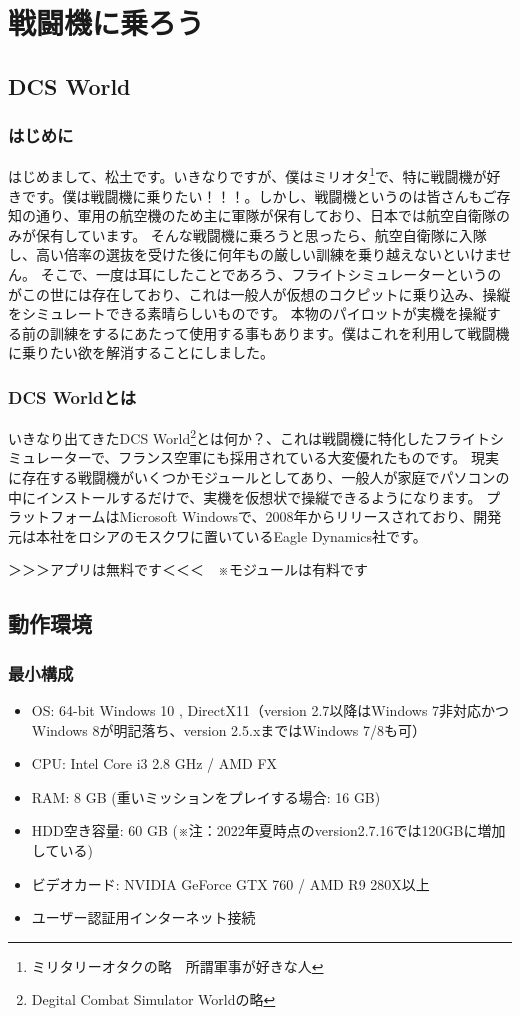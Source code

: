 \chapter{戦闘機に乗ろう}
\section{DCS World}
\subsection{はじめに}
はじめまして、松土です。いきなりですが、僕はミリオタ\footnote{ミリタリーオタクの略　所謂軍事が好きな人}で、特に戦闘機が好きです。僕は戦闘機に乗りたい！！！。しかし、戦闘機というのは皆さんもご存知の通り、軍用の航空機のため主に軍隊が保有しており、日本では航空自衛隊のみが保有しています。
そんな戦闘機に乗ろうと思ったら、航空自衛隊に入隊し、高い倍率の選抜を受けた後に何年もの厳しい訓練を乗り越えないといけません。
そこで、一度は耳にしたことであろう、フライトシミュレーターというのがこの世には存在しており、これは一般人が仮想のコクピットに乗り込み、操縦をシミュレートできる素晴らしいものです。
本物のパイロットが実機を操縦する前の訓練をするにあたって使用する事もあります。僕はこれを利用して戦闘機に乗りたい欲を解消することにしました。
\subsection{DCS Worldとは}
いきなり出てきたDCS World\footnote{Degital Combat Simulator Worldの略}とは何か？、これは戦闘機に特化したフライトシミュレーターで、フランス空軍にも採用されている大変優れたものです。
現実に存在する戦闘機がいくつかモジュールとしてあり、一般人が家庭でパソコンの中にインストールするだけで、実機を仮想状で操縦できるようになります。
プラットフォームはMicrosoft Windowsで、2008年からリリースされており、開発元は本社をロシアのモスクワに置いているEagle Dynamics社です。


＞＞＞アプリは無料です＜＜＜　※モジュールは有料です
\section{動作環境}
\subsection{最小構成}
\begin{itemize}
  \item OS: 64-bit Windows 10 , DirectX11（version 2.7以降はWindows 7非対応かつWindows 8が明記落ち、version 2.5.xまではWindows 7/8も可）
  \item CPU: Intel Core i3 2.8 GHz / AMD FX
  \item RAM: 8 GB (重いミッションをプレイする場合: 16 GB)
  \item HDD空き容量: 60 GB (※注：2022年夏時点のversion2.7.16では120GBに増加している)
  \item ビデオカード: NVIDIA GeForce GTX 760 / AMD R9 280X以上
  \item ユーザー認証用インターネット接続
\end{itemize}

